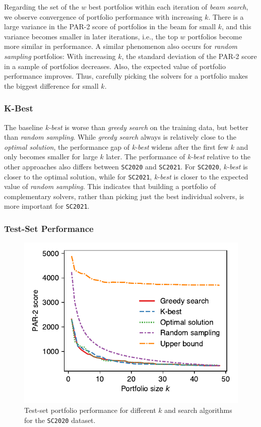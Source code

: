 \documentclass[conference]{IEEEtran}
\begin{document}
Regarding the set of the $w$ best portfolios within each iteration of \emph{beam search}, we observe convergence of portfolio performance with increasing $k$. 
There is a large variance in the PAR-2 score of portfolios in the beam for small $k$, and this variance becomes smaller in later iterations, i.e., the top $w$ portfolios become more similar in performance.
A similar phenomenon also occurs for \emph{random sampling} portfolios:
With increasing $k$, the standard deviation of the PAR-2 score in a sample of portfolios decreases.
Also, the expected value of portfolio performance improves.
Thus, carefully picking the solvers for a portfolio makes the biggest difference for small $k$.

\subsubsection{K-Best}

The baseline \emph{k-best} is worse than \emph{greedy search} on the training data, but better than \emph{random sampling}.
While \emph{greedy search} always is relatively close to the \emph{optimal solution}, the performance gap of \emph{k-best} widens after the first few $k$ and only becomes smaller for large $k$ later.
The performance of \emph{k-best} relative to the other approaches also differs between \texttt{SC2020} and \texttt{SC2021}.
For \texttt{SC2020}, \emph{k-best} is closer to the optimal solution, while for \texttt{SC2021}, \emph{k-best} is closer to the expected value of \emph{random sampling}.
This indicates that building a portfolio of complementary solvers, rather than picking just the best individual solvers, is more important for \texttt{SC2021}.

\subsubsection{Test-Set Performance}

\begin{figure}[t]
	\centering
	\includegraphics[width=0.98\columnwidth]{plots/search-test-objective-2020.pdf}
	\caption{
		Test-set portfolio performance for different $k$ and search algorithms for the \texttt{SC2020} dataset.
	}
	\label{fig:search-test-objective-2020}
\end{figure}
\end{document}
